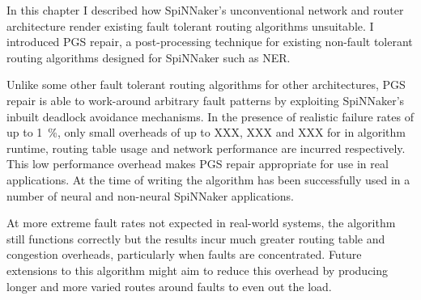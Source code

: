 		In this chapter I described how SpiNNaker's unconventional network and
		router architecture render existing fault tolerant routing algorithms
		unsuitable. I introduced PGS repair, a post-processing technique for
		existing non-fault tolerant routing algorithms designed for SpiNNaker such
		as NER.
		
		Unlike some other fault tolerant routing algorithms for other
		architectures, PGS repair is able to work-around arbitrary fault patterns
		by exploiting SpiNNaker's inbuilt deadlock avoidance mechanisms. In the
		presence of realistic failure rates of up to \SI{1}{\percent}, only small
		overheads of up to XXX, XXX and XXX for in algorithm runtime, routing table
		usage and network performance are incurred respectively. This low
		performance overhead makes PGS repair appropriate for use in real
		applications. At the time of writing the algorithm has been successfully
		used in a number of neural and non-neural SpiNNaker applications.
		
		At more extreme fault rates not expected in real-world systems, the
		algorithm still functions correctly but the results incur much greater
		routing table and congestion overheads, particularly when faults are
		concentrated. Future extensions to this algorithm might aim to reduce this
		overhead by producing longer and more varied routes around faults to even
		out the load.
